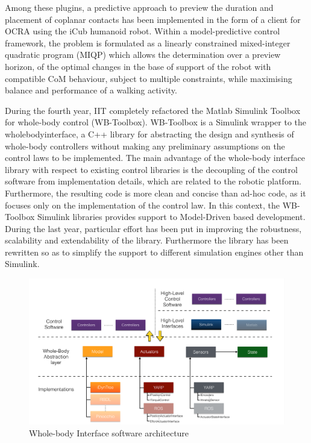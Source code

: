 Among these plugins, a predictive approach \cite{ibanez2015Emergence} to
preview the duration and placement of coplanar contacts has been implemented
in the form of a client for OCRA using the iCub humanoid robot.  Within a
model-predictive control framework, the problem is formulated as a linearly
constrained mixed-integer quadratic program (MIQP) which allows the
determination over a preview horizon, of the optimal changes in the base of
support of the robot with compatible CoM behaviour, subject to multiple
constraints, while maximising balance and performance of a walking activity.

During the fourth year, IIT completely refactored the Matlab Simulink Toolbox
for whole-body control (WB-Toolbox).  WB-Toolbox is a Simulink wrapper to the
wholebodyinterface, a C++ library for abstracting the design and synthesis of
whole-body controllers without making any preliminary assumptions on the
control laws to be implemented.  The main advantage of the whole-body
interface library with respect to existing control libraries is the decoupling
of the control software from implementation details, which are related to the
robotic platform.  Furthermore, the resulting code is more clean and concise
than ad-hoc code, as it focuses only on the implementation of the control law.
In this context, the WB-Toolbox Simulink libraries provides support to
Model-Driven based development.  During the last year, particular effort has
been put in improving the robustness, scalability and extendability of the
library.  Furthermore the library has been rewritten so as to simplify the
support to different simulation engines other than Simulink.
%
\begin{figure}[h]
    \centering
    \includegraphics[width=.9\textwidth]{images/WBI_diagram.pdf}
  \caption{Whole-body Interface software architecture}
  \label{fig:images_WBI_diagram}
\end{figure}
%

